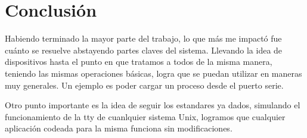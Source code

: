 \section{Conclusión}

Habiendo terminado la mayor parte del trabajo, lo que más me impactó fue cuánto se resuelve
abstayendo partes claves del sistema. Llevando la idea de dispositivos hasta el punto en que
tratamos a todos de la misma manera, teniendo las mismas operaciones básicas, logra que se puedan
utilizar en maneras muy generales. Un ejemplo es poder cargar un proceso desde el puerto serie.

Otro punto importante es la idea de seguir los estandares ya dados, simulando el funcionamiento de
la tty de cuanlquier sistema Unix, logramos que cualquier aplicación codeada para la misma funciona
sin modificaciones.
